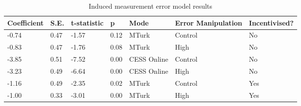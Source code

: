 \begin{table}[]
\centering
\begin{tabular}{lllllll}
  \hline
Coefficient & S.E. & t-statistic & p & Mode & Error Manipulation & Incentivised? \\ 
  \hline
-0.74 & 0.47 & -1.57 & 0.12 & MTurk & Control & No \\ 
  -0.83 & 0.47 & -1.76 & 0.08 & MTurk & High & No \\ 
  -3.85 & 0.51 & -7.52 & 0.00 & CESS Online & Control & No \\ 
  -3.23 & 0.49 & -6.64 & 0.00 & CESS Online & High & No \\ 
   \hline
-1.16 & 0.49 & -2.35 & 0.02 & MTurk & Control & Yes \\ 
  -1.00 & 0.33 & -3.01 & 0.00 & MTurk & High & Yes \\ 
   \hline
\end{tabular}
\caption{Induced measurement error model results} 
\label{tab:india_results}
\end{table}
